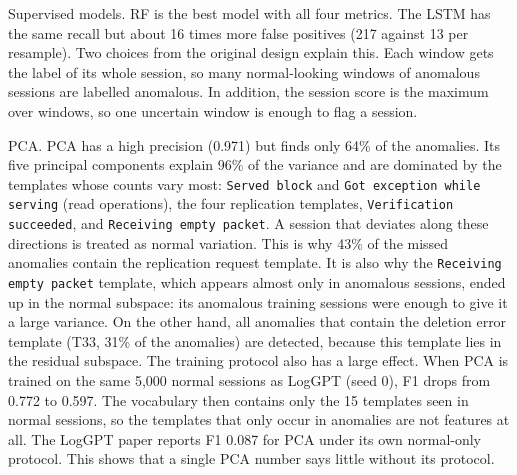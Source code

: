 \documentclass[10pt, conference]{IEEEtran}
\renewcommand{\paragraph}[1]{\noindent\textsf{#1}.}
\newcommand{\tpl}[1]{\texttt{\small #1}}
\begin{document}
\paragraph{Supervised models} RF is the best model with all four metrics. The LSTM has the same recall but about 16 times more false positives (217 against 13 per resample). Two choices from the original design explain this. Each window gets the label of its whole session, so many normal-looking windows of anomalous sessions are labelled anomalous. In addition, the session score is the maximum over windows, so one uncertain window is enough to flag a session.

\paragraph{PCA} PCA has a high precision (0.971) but finds only 64\% of the anomalies. Its five principal components explain 96\% of the variance and are dominated by the templates whose counts vary most: \tpl{Served block} and \tpl{Got exception while serving} (read operations), the four replication templates, \tpl{Verification succeeded}, and \tpl{Receiving empty packet}. A session that deviates along these directions is treated as normal variation. This is why 43\% of the missed anomalies contain the replication request template. It is also why the \tpl{Receiving empty packet} template, which appears almost only in anomalous sessions, ended up in the normal subspace: its anomalous training sessions were enough to give it a large variance. On the other hand, all anomalies that contain the deletion error template (T33, 31\% of the anomalies) are detected, because this template lies in the residual subspace. The training protocol also has a large effect. When PCA is trained on the same 5,000 normal sessions as LogGPT (seed 0), F1 drops from 0.772 to 0.597. The vocabulary then contains only the 15 templates seen in normal sessions, so the templates that only occur in anomalies are not features at all. The LogGPT paper reports F1 0.087 for PCA under its own normal-only protocol. This shows that a single PCA number says little without its protocol.
\end{document}
